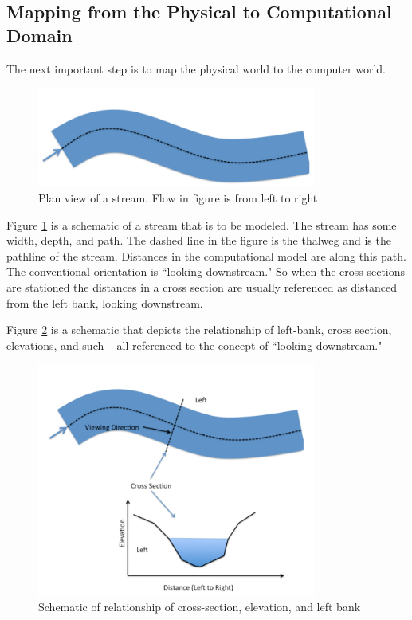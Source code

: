 \subsection{Mapping from the Physical to Computational Domain}
The next important step is to map the physical world to the computer world.

\begin{figure}[h!] %
   \centering
   \includegraphics[width=3.6in]{./14-UnsteadyOpenChannel/stream-schematic.jpg} 
   \caption{Plan view of a stream.  Flow in figure is from left to right}
   \label{fig:stream-schematic}
\end{figure}

Figure \ref{fig:stream-schematic} is a schematic of a stream that is to be modeled. 
The stream has some width, depth, and path. 
The dashed line in the figure is the thalweg and is the pathline of the stream. 
Distances in the computational model are along this path. 
The conventional orientation is ``looking downstream." 
So when the cross sections are stationed the distances in a cross section are usually referenced as distanced from the left bank, looking downstream.

Figure \ref{fig:stream-section-schematic} is a schematic that depicts the relationship of left-bank, cross section, elevations, and such -- all referenced to the concept of ``looking downstream."

\begin{figure}[h!] %
   \centering
   \includegraphics[width=3.6in]{./14-UnsteadyOpenChannel/stream-section-schematic.jpg} 
   \caption{Schematic of relationship of cross-section, elevation, and left bank}
   \label{fig:stream-section-schematic}
\end{figure}
\newpage

